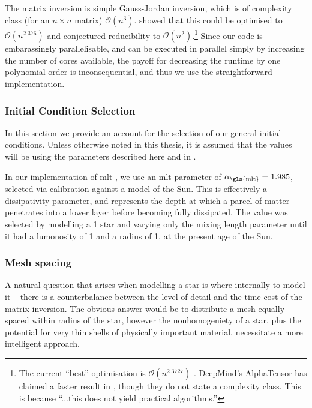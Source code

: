 The matrix inversion is simple Gauss-Jordan inversion, which is of complexity class (for an $n\times n$ matrix) $\mathcal{O}(n^3)$. \citet{Coppersmith:1987} showed that this could be optimised to $\mathcal{O}(n^{2.376})$ and conjectured reducibility to $\mathcal{O}(n^2)$.\footnote{The current ``best'' optimisation is $\mathcal{O}(n^{2.3727})$ \citep{Williams:2012}. DeepMind's AlphaTensor has claimed a faster result in \citet{Fawzi:2022}, though they do not state a complexity class. This is because ``...this does not yield practical algorithms.''} Since our code is embarassingly parallelisable, and can be executed in parallel simply by increasing the number of cores available, the payoff for decreasing the runtime by one polynomial order is inconsequential, and thus we use the straightforward implementation.

\subsubsection{Initial Condition Selection}

In this section we provide an account for the selection of our general initial conditions. Unless otherwise noted in this thesis, it is assumed that the values will be using the parameters described here and in .

In our implementation of \gls{mlt} \citep{Vitense:1953, Bohm-vitense:1958, Cox:1968}, we use an \gls{mlt} parameter of $\alpha_\text{\gls{mlt}}=1.985$, selected via calibration against a model of the Sun. This is effectively a dissipativity parameter, and represents the depth at which a parcel of matter penetrates into a lower layer before becoming fully dissipated. The value was selected by modelling a \SI{1}{\msun} star and varying only the mixing length parameter until it had a lumonosity of \SI{1}{\lsun} and a radius of \SI{1}{\rsun}, at the present age of the Sun.

\subsubsection{Mesh spacing}

A natural question that arises when modelling a star is where internally to model it -- there is a counterbalance between the level of detail and the time cost of the matrix inversion. The obvious answer would be to distribute a mesh equally spaced within radius of the star, however the nonhomogeniety of a star, plus the potential for very thin shells of physically important material, necessitate a more intelligent approach.

